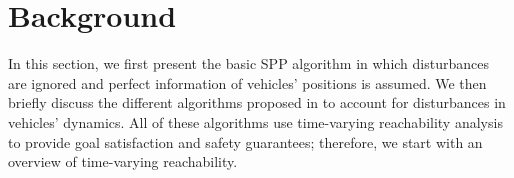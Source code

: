 \section{Background \label{sec:background}}
In this section, we first present the basic SPP algorithm \cite{Chen15c} in which disturbances are ignored and perfect information of vehicles' positions is assumed. We then briefly discuss the different algorithms proposed in \cite{Bansal2017} to account for disturbances in vehicles' dynamics. All of these algorithms use time-varying reachability analysis to provide goal satisfaction and safety guarantees; therefore, we start with an overview of time-varying reachability.

%

